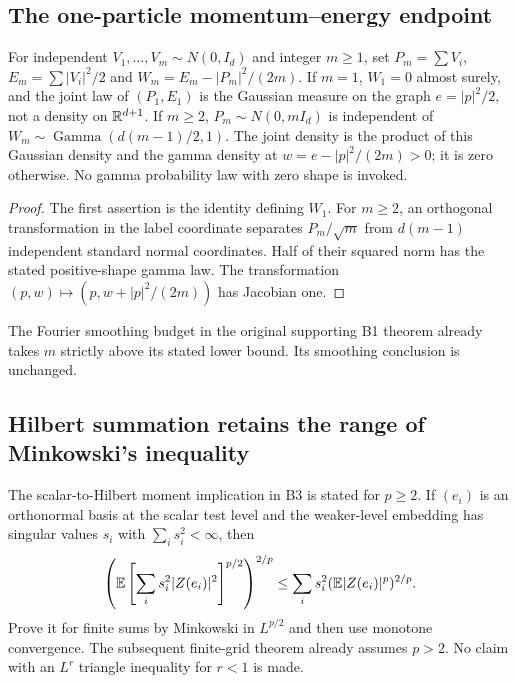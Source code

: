 \subsection{The one-particle momentum--energy endpoint}
\begin{proposition}\label{prop:r35-anchor-endpoint}
For independent $V_1,\ldots,V_m\sim N(0,I_d)$ and integer $m\ge1$, set
$P_m=\sum V_i$, $E_m=\sum|V_i|^2/2$ and $W_m=E_m-|P_m|^2/(2m)$.
If $m=1$, $W_1=0$ almost surely, and the joint law of $(P_1,E_1)$ is the Gaussian measure on the graph $e=|p|^2/2$, not a density on $\mathbb R^{d+1}$.
If $m\ge2$, $P_m\sim N(0,mI_d)$ is independent of $W_m\sim\operatorname{Gamma}(d(m-1)/2,1)$. The joint density is the product of this Gaussian density and the gamma density at $w=e-|p|^2/(2m)>0$; it is zero otherwise. No gamma probability law with zero shape is invoked.
\end{proposition}
\begin{proof}
The first assertion is the identity defining $W_1$. For $m\ge2$, an orthogonal transformation in the label coordinate separates $P_m/\sqrt m$ from $d(m-1)$ independent standard normal coordinates. Half of their squared norm has the stated positive-shape gamma law. The transformation $(p,w)\mapsto(p,w+|p|^2/(2m))$ has Jacobian one.
\end{proof}
The Fourier smoothing budget in the original supporting B1 theorem already takes $m$ strictly above its stated lower bound. Its smoothing conclusion is unchanged.

\subsection{Hilbert summation retains the range of Minkowski's inequality}
The scalar-to-Hilbert moment implication in B3 is stated for $p\ge2$. If $(e_i)$ is an orthonormal basis at the scalar test level and the weaker-level embedding has singular values $s_i$ with $\sum_i s_i^2<\infty$, then
\[
 \left(\mathbb E\left[\sum_i s_i^2|Z(e_i)|^2\right]^{p/2}\right)^{2/p}
 \le\sum_i s_i^2(\mathbb E|Z(e_i)|^p)^{2/p}.
\]
Prove it for finite sums by Minkowski in $L^{p/2}$ and then use monotone convergence. The subsequent finite-grid theorem already assumes $p>2$. No claim with an $L^r$ triangle inequality for $r<1$ is made.

